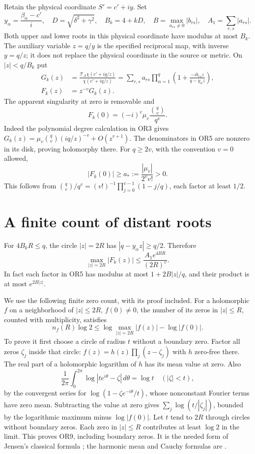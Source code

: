 \documentclass[11pt]{article}
\newcommand{\TA}{\mathcal T_A}
\begin{document}
Retain the physical coordinate $S'=c'+iy$. Set
\[
y_\alpha=\frac{\beta_\alpha-c'}i,\quad
D=\sqrt{\delta^2+\gamma^2},\quad B_k=4+kD,\quad
B=\max_{a_{rs}\ne0}|b_{rs}|,\quad A_1=\sum_{r,s}|a_{rs}|.
\tag{OR4}
\]
Both upper and lower roots in this physical coordinate have modulus
at most $B_k$. The auxiliary variable $z=q/y$ is the specified
reciprocal map, with inverse $y=q/z$; it does not replace the
physical coordinate in the source or metric. On $|z|<q/B_k$ put
\[
\begin{split}
G_k(z)&=\frac{\TA\chi(c'+iq/z)}{\chi(c'+iq/z)}
=\sum_{r,s}a_{rs}\prod_{\alpha=1}^q
 \left(1+\frac{-ib_{rs}z}{q-y_\alpha z}\right),\\
F_k(z)&=z^{-v}G_k(z).
\end{split}\tag{OR5}
\]
The apparent singularity at zero is removable and
\[
F_k(0)=(-i)^v\mu_v\frac{\binom qv}{q^v}.
\tag{OR6}
\]
Indeed the polynomial degree calculation in OR3 gives
$G_k(z)=\mu_v\binom qv(iq/z)^{-v}+O(z^{v+1})$.
The denominators in OR5 are nonzero in its disk, proving
holomorphy there. For $q\ge2v$, with the convention $v=0$ allowed,
\[
|F_k(0)|\ge a_*:=\frac{|\mu_v|}{2^v v!}>0.
\tag{OR7}
\]
This follows from $\binom qv/q^v=(v!)^{-1}
\prod_{j=0}^{v-1}(1-j/q)$, each factor at least $1/2$.

\section{A finite count of distant roots}
For $4B_kR\le q$, the circle $|z|=2R$ has
$|q-y_\alpha z|\ge q/2$. Therefore
\[
\max_{|z|=2R}|F_k(z)|
 \le \frac{A_1e^{4BR}}{(2R)^v}.
\tag{OR8}
\]
In fact each factor in OR5 has modulus at most
$1+2B|z|/q$, and their product is at most $e^{2B|z|}$.

We use the following finite zero count, with its proof included.
For a holomorphic $f$ on a neighborhood of $|z|\le2R$,
$f(0)\ne0$, the number of its zeros in $|z|\le R$, counted with
multiplicity, satisfies
\[
n_f(R)\log2\le
\log\max_{|z|=2R}|f(z)|-\log|f(0)|.
\tag{OR9}
\]
To prove it first choose a circle of radius $t$ without a boundary
zero. Factor all zeros $\zeta_j$ inside that circle:
$f(z)=h(z)\prod_j(z-\zeta_j)$ with $h$ zero-free there.
The real part of a holomorphic logarithm of $h$ has its mean value
at zero. Also
\[
\frac1{2\pi}\int_0^{2\pi}\log|te^{i\theta}-\zeta|\,d\theta=\log t
\quad(|\zeta|<t),
\]
by the convergent series for $\log(1-\zeta e^{-i\theta}/t)$,
whose nonconstant Fourier terms have zero mean. Subtracting the
value at zero gives $\sum_j\log(t/|\zeta_j|)$, bounded by the
logarithmic maximum minus $\log|f(0)|$.
Let $t$ tend to $2R$ through circles without boundary zeros.
Each zero in $|z|\le R$ contributes at least $\log2$ in the limit.
This proves OR9, including boundary zeros. It is the needed form
of Jensen's classical formula \cite{Jensen}; the harmonic mean
and Cauchy formulas are \cite[1.9.31, 1.9.33]{DLMF1}.
\end{document}
